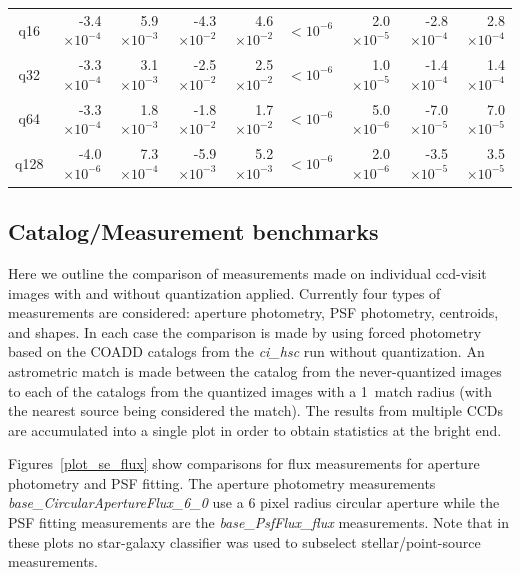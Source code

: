 \begin{table}
\begin{tabular}[]{crrrrrrrr}
  q16   & -3.4$\times 10^{-4}$ & 5.9$\times 10^{-3}$ & -4.3$\times 10^{-2}$ & 4.6$\times 10^{-2}$ & $<10^{-6}$ & 2.0$\times 10^{-5}$ & -2.8$\times 10^{-4}$ & 2.8$\times 10^{-4}$ \\
  q32   & -3.3$\times 10^{-4}$ & 3.1$\times 10^{-3}$ & -2.5$\times 10^{-2}$ & 2.5$\times 10^{-2}$ & $<10^{-6}$ & 1.0$\times 10^{-5}$ & -1.4$\times 10^{-4}$ & 1.4$\times 10^{-4}$ \\
  q64   & -3.3$\times 10^{-4}$ & 1.8$\times 10^{-3}$ & -1.8$\times 10^{-2}$ & 1.7$\times 10^{-2}$ & $<10^{-6}$ & 5.0$\times 10^{-6}$ & -7.0$\times 10^{-5}$ & 7.0$\times 10^{-5}$ \\
  q128  & -4.0$\times 10^{-6}$ & 7.3$\times 10^{-4}$ & -5.9$\times 10^{-3}$ & 5.2$\times 10^{-3}$ & $<10^{-6}$ & 2.0$\times 10^{-6}$ & -3.5$\times 10^{-5}$ & 3.5$\times 10^{-5}$ \\
\hline
\end{tabular}
\label{tab_agg_image_stat}
\end{table}





\subsection{Catalog/Measurement benchmarks}

Here we outline the comparison of measurements made on individual ccd-visit images with and without 
quantization applied.  Currently four types of measurements are considered: aperture photometry, 
PSF photometry, centroids, and shapes.  In each case the comparison is made by using forced 
photometry based on the COADD catalogs from the {\it ci\_hsc} run without quantization.
An astrometric match is made between the catalog from the never-quantized images to each of the
catalogs from the quantized images with a 1\arcsec\ match radius (with the nearest source being
considered the match).  The results from multiple CCDs are accumulated into a single plot in order
to obtain statistics at the bright end.

Figures~\ref{plot_se_flux} show comparisons for flux measurements for aperture photometry 
and PSF fitting.  The aperture photometry measurements {\it base\_CircularApertureFlux\_6\_0} 
use a 6 pixel radius circular aperture while the PSF fitting measurements are the
{\it base\_PsfFlux\_flux} measurements.  Note that in these plots no star-galaxy classifier 
was used to subselect stellar/point-source measurements.

